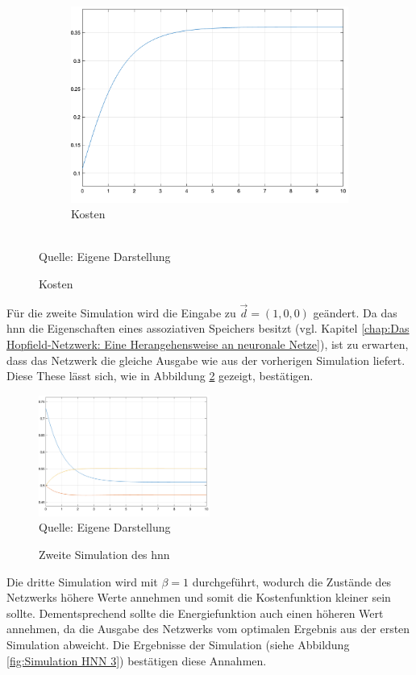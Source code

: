 \begin{figure}[h]
\begin{subfigure}[b]{0.32\textwidth}
    \includegraphics[width=\textwidth]{abbildungen/hnn_simulation_1_kostenfunktion.png}
    \caption{Kosten}
  \end{subfigure}
  \\
  Quelle: Eigene Darstellung
  \label{fig:Simulation HNN 1}
\end{figure}

Für die zweite Simulation wird die Eingabe zu \(\vec{d}=(1,0,0)\) geändert. Da das \ac{hnn} die Eigenschaften eines assoziativen Speichers besitzt (vgl. Kapitel \ref{chap:Das Hopfield-Netzwerk: Eine Herangehensweise an neuronale Netze}), ist zu erwarten, dass das Netzwerk die gleiche Ausgabe wie aus der vorherigen Simulation liefert. Diese These lässt sich, wie in Abbildung \ref{fig:Simulation HNN 2} gezeigt, bestätigen.

\begin{figure}[h]
  \caption{Zweite Simulation des \ac{hnn}}
  \centering
  \includegraphics[width=0.5\textwidth]{abbildungen/hnn_simulation_2_ausgabe.png}
  \\
  Quelle: Eigene Darstellung
  \label{fig:Simulation HNN 2}
\end{figure}

Die dritte Simulation wird mit \(\beta=1\) durchgeführt, wodurch die Zustände des Netzwerks höhere Werte annehmen und somit die Kostenfunktion kleiner sein sollte. Dementsprechend sollte die Energiefunktion auch einen höheren Wert annehmen, da die Ausgabe des Netzwerks vom optimalen Ergebnis aus der ersten Simulation abweicht. Die Ergebnisse der Simulation (siehe Abbildung \ref{fig:Simulation HNN 3}) bestätigen diese Annahmen.

